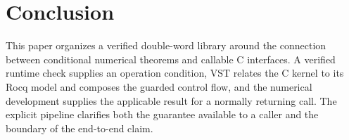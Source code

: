 \section{Conclusion}
\label{sec:conclusion}

This paper organizes a verified double-word library around the connection
between conditional numerical theorems and callable C interfaces.  A verified
runtime check supplies an operation condition, VST relates the C kernel to its
Rocq model and composes the guarded control flow, and the numerical development
supplies the applicable result for a normally returning call.  The explicit
pipeline clarifies both the guarantee available to a caller and the boundary of
the end-to-end claim.
